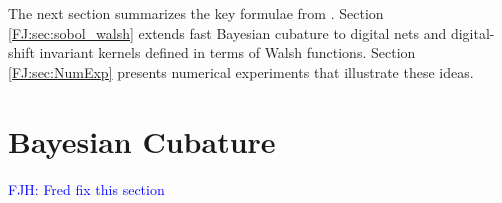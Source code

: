 \documentclass[graybox,footinfo]{svmult}
\newcommand{\FJHNote}[1]{{\textcolor{blue}{FJH: #1}}}
\begin{document}

The next section summarizes the key formulae from \cite{RatHic19a}.  Section \ref{FJ:sec:sobol_walsh} extends fast Bayesian cubature to digital nets and digital-shift invariant kernels defined in terms of Walsh functions.  Section \ref{FJ:sec:NumExp} presents numerical experiments that illustrate these ideas.  




\section{Bayesian Cubature}
\label{FJ:sec:BC} 


\FJHNote{Fred fix this section}
\end{document}
